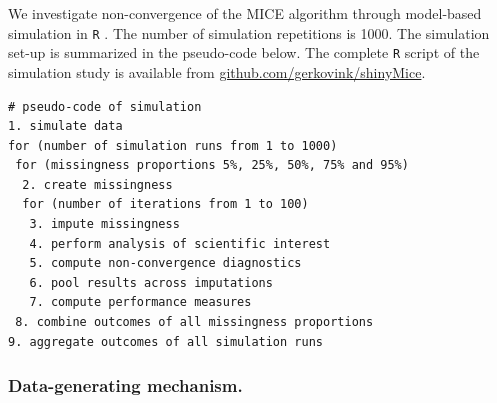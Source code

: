 \documentclass[Royal,times,sageh]{sagej}
\begin{document}
We investigate non-convergence of the MICE algorithm through model-based simulation in \texttt{R} \citep[version 3.6.3;][]{R}. The number of simulation repetitions is 1000. The simulation set-up is summarized in the pseudo-code below. The complete \texttt{R} script of the simulation study is available from \href{https://github.com/gerkovink/shinyMice/tree/master/3.Thesis/1.SimulationStudy}{github.com/gerkovink/shinyMice}.

\begin{verbatim}
# pseudo-code of simulation 
1. simulate data 
for (number of simulation runs from 1 to 1000)
 for (missingness proportions 5%, 25%, 50%, 75% and 95%)
  2. create missingness
  for (number of iterations from 1 to 100)
   3. impute missingness
   4. perform analysis of scientific interest
   5. compute non-convergence diagnostics 
   6. pool results across imputations
   7. compute performance measures
 8. combine outcomes of all missingness proportions
9. aggregate outcomes of all simulation runs 
\end{verbatim}

\hypertarget{data-generating-mechanism.}{%
\subsubsection{Data-generating mechanism.}\label{data-generating-mechanism.}}
\end{document}
